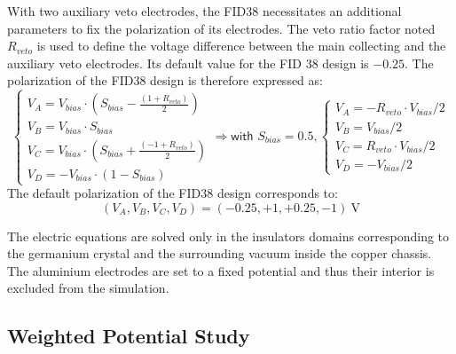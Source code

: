 
With two auxiliary veto electrodes, the FID38 necessitates an additional parameters to fix the polarization of its electrodes. The veto ratio factor noted $R_{veto}$ is used to define the voltage difference between the main collecting and the auxiliary veto electrodes. Its default value for the FID 38 design is $-0.25$. The polarization of the FID38 design is therefore expressed as:
\begin{equation}
\label{eq:fid38-polarization}
\begin{cases}
\displaystyle 
V_A = V_{bias} \cdot \left( S_{bias} - \frac{\left( 1 + R_{veto}\right)}{2}\right)
\\
\displaystyle
V_B = V_{bias} \cdot S_{bias}
\\
\displaystyle
V_C = V_{bias} \cdot \left( S_{bias} + \frac{\left( -1 + R_{veto}\right)}{2}\right)
\\
\displaystyle
V_D = - V_{bias} \cdot (1 - S_{bias})
\end{cases}
\Rightarrow
\textsf{with } S_{bias} = 0.5,
\begin{cases}
\displaystyle 
V_A = - R_{veto} \cdot V_{bias} /2
\\
\displaystyle
V_B = V_{bias} /2 
\\
\displaystyle
V_C = R_{veto} \cdot V_{bias} /2
\\
\displaystyle
V_D = -  V_{bias}/2
\end{cases}
\end{equation}
The default polarization of the FID38 design corresponds to:
\begin{equation}
\label{eq:fid38-polarization-default}
\left( V_A, V_B, V_C, V_D \right) = (-0.25, +1, +0.25, -1) \ \si{\volt}
\end{equation}


The electric equations are solved only in the insulators domains corresponding to the germanium crystal and the surrounding vacuum inside the copper chassis. The aluminium electrodes are set to a fixed potential and thus their interior is excluded from the simulation. 


\subsection{Weighted Potential Study}
\label{par:weighting-potential}

